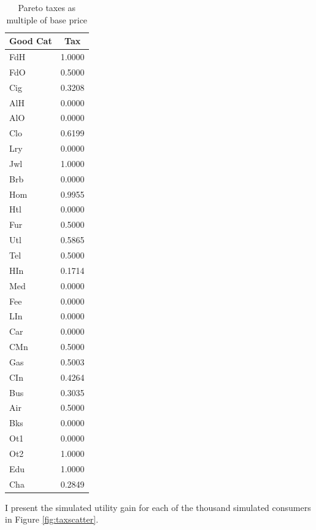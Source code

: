 \documentclass[12pt]{article}
\begin{document}
\begin{table}
    \centering
	\begin{tabular}{|l|c|}
	    \hline
	    \textbf{Good Cat} & \textbf{Tax} \\
	    \hline
	    FdH &  1.0000\\
	    \hline
	    FdO &  0.5000\\ 
	    \hline
	    Cig &  0.3208\\ 
	    \hline
	    AlH &  0.0000\\ 
	    \hline
	    AlO &  0.0000\\ 
	    \hline
	    Clo &  0.6199\\ 
	    \hline
	    Lry &  0.0000\\ 
	    \hline
	    Jwl &  1.0000\\ 
	    \hline
	    Brb &  0.0000\\ 
	    \hline
	    Hom &  0.9955\\ 
	    \hline
	    Htl &  0.0000\\ 
	    \hline
	    Fur &  0.5000\\ 
	    \hline
	    Utl &  0.5865\\ 
	    \hline
	    Tel &  0.5000\\ 
	    \hline
	    HIn &  0.1714\\ 
	    \hline
	    Med &  0.0000\\ 
	    \hline
	    Fee &  0.0000\\ 
	    \hline
	    LIn &  0.0000\\ 
	    \hline
	    Car &  0.0000\\ 
	    \hline
	    CMn &  0.5000\\ 
	    \hline
	    Gas &  0.5003\\ 
	    \hline
	    CIn &  0.4264\\ 
	    \hline
	    Bus &  0.3035\\ 
	    \hline
	    Air &  0.5000\\ 
	    \hline
	    Bks &  0.0000\\ 
	    \hline
	    Ot1 &  0.0000\\ 
	    \hline
	    Ot2 &  1.0000\\ 
	    \hline
	    Edu &  1.0000\\ 
	    \hline
	    Cha &  0.2849\\ 
	    \hline
	\end{tabular}
    \caption{Pareto taxes as multiple of base price}
    \label{tab:opttax}
\end{table}
I present the simulated utility gain for each of the thousand simulated consumers in Figure \ref{fig:taxscatter}.
\end{document}
